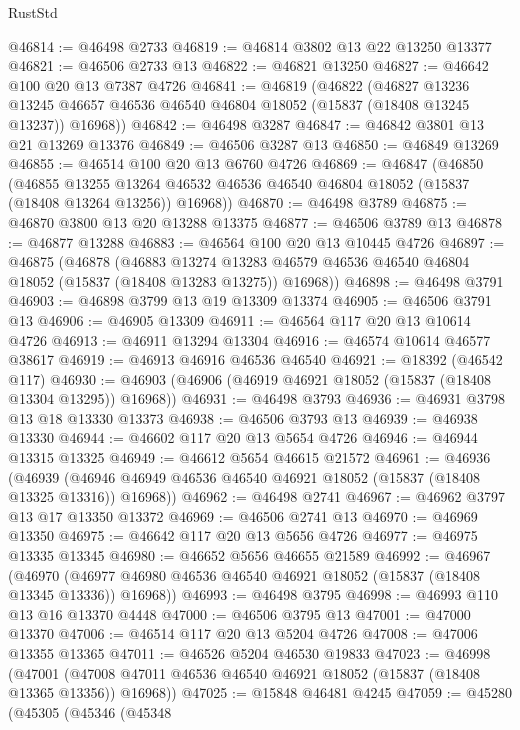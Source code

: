 \begin{lexlean}{RustStd}
\begin{coremodule}
{\begin{coremodule}
{{{{{{{{{{{{{{{{{{{{{{{{{{{{{{{{{{{{{{{{{{{{{{{{{{{{{{{{{{{{@46814 := @46498 @2733
@46819 := @46814 @3802 @13 @22 @13250 @13377
@46821 := @46506 @2733 @13
@46822 := @46821 @13250
@46827 := @46642 @100 @20 @13 @7387 @4726
@46841 := @46819
    (@46822
      (@46827
        @13236
        @13245
        @46657
        @46536
        @46540
        @46804
        @18052
        (@15837 (@18408 @13245 @13237))
        @16968))
@46842 := @46498 @3287
@46847 := @46842 @3801 @13 @21 @13269 @13376
@46849 := @46506 @3287 @13
@46850 := @46849 @13269
@46855 := @46514 @100 @20 @13 @6760 @4726
@46869 := @46847
    (@46850
      (@46855
        @13255
        @13264
        @46532
        @46536
        @46540
        @46804
        @18052
        (@15837 (@18408 @13264 @13256))
        @16968))
@46870 := @46498 @3789
@46875 := @46870 @3800 @13 @20 @13288 @13375
@46877 := @46506 @3789 @13
@46878 := @46877 @13288
@46883 := @46564 @100 @20 @13 @10445 @4726
@46897 := @46875
    (@46878
      (@46883
        @13274
        @13283
        @46579
        @46536
        @46540
        @46804
        @18052
        (@15837 (@18408 @13283 @13275))
        @16968))
@46898 := @46498 @3791
@46903 := @46898 @3799 @13 @19 @13309 @13374
@46905 := @46506 @3791 @13
@46906 := @46905 @13309
@46911 := @46564 @117 @20 @13 @10614 @4726
@46913 := @46911 @13294 @13304
@46916 := @46574 @10614 @46577 @38617
@46919 := @46913 @46916 @46536 @46540
@46921 := @18392 (@46542 @117)
@46930 := @46903 (@46906 (@46919 @46921 @18052 (@15837 (@18408 @13304 @13295)) @16968))
@46931 := @46498 @3793
@46936 := @46931 @3798 @13 @18 @13330 @13373
@46938 := @46506 @3793 @13
@46939 := @46938 @13330
@46944 := @46602 @117 @20 @13 @5654 @4726
@46946 := @46944 @13315 @13325
@46949 := @46612 @5654 @46615 @21572
@46961 := @46936
    (@46939 (@46946 @46949 @46536 @46540 @46921 @18052 (@15837 (@18408 @13325 @13316)) @16968))
@46962 := @46498 @2741
@46967 := @46962 @3797 @13 @17 @13350 @13372
@46969 := @46506 @2741 @13
@46970 := @46969 @13350
@46975 := @46642 @117 @20 @13 @5656 @4726
@46977 := @46975 @13335 @13345
@46980 := @46652 @5656 @46655 @21589
@46992 := @46967
    (@46970 (@46977 @46980 @46536 @46540 @46921 @18052 (@15837 (@18408 @13345 @13336)) @16968))
@46993 := @46498 @3795
@46998 := @46993 @110 @13 @16 @13370 @4448
@47000 := @46506 @3795 @13
@47001 := @47000 @13370
@47006 := @46514 @117 @20 @13 @5204 @4726
@47008 := @47006 @13355 @13365
@47011 := @46526 @5204 @46530 @19833
@47023 := @46998
    (@47001 (@47008 @47011 @46536 @46540 @46921 @18052 (@15837 (@18408 @13365 @13356)) @16968))
@47025 := @15848 @46481 @4245
@47059 := @45280
    (@45305
      (@45346
        (@45348
}}}}}}}}}}}}}}}}}}}}}}}}}}}}}}}}}}}}}}}}}}}}}}}}}}}}}}}}}}}}
\end{coremodule}}
\end{coremodule}
\end{lexlean}
